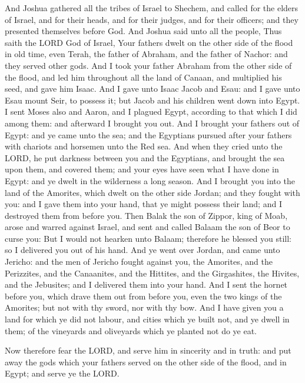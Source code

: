  And Joshua gathered all the tribes of Israel to Shechem,
and called for the elders of Israel, and for their heads, and for their
judges, and for their officers; and they presented themselves before
God.  And Joshua said unto all the people, Thus saith the
LORD God of Israel, Your fathers dwelt on the other side of the flood in
old time, even Terah, the father of Abraham, and the father of Nachor:
and they served other gods.  And I took your father
Abraham from the other side of the flood, and led him throughout all the
land of Canaan, and multiplied his seed, and gave him Isaac.
 And I gave unto Isaac Jacob and Esau: and I gave unto
Esau mount Seir, to possess it; but Jacob and his children went down
into Egypt.  I sent Moses also and Aaron, and I plagued
Egypt, according to that which I did among them: and afterward I brought
you out.  And I brought your fathers out of Egypt: and ye
came unto the sea; and the Egyptians pursued after your fathers with
chariots and horsemen unto the Red sea.  And when they
cried unto the LORD, he put darkness between you and the Egyptians, and
brought the sea upon them, and covered them; and your eyes have seen
what I have done in Egypt: and ye dwelt in the wilderness a long season.
 And I brought you into the land of the Amorites, which
dwelt on the other side Jordan; and they fought with you: and I gave
them into your hand, that ye might possess their land; and I destroyed
them from before you.  Then Balak the son of Zippor, king
of Moab, arose and warred against Israel, and sent and called Balaam the
son of Beor to curse you:  But I would not hearken unto
Balaam; therefore he blessed you still: so I delivered you out of his
hand.  And ye went over Jordan, and came unto Jericho:
and the men of Jericho fought against you, the Amorites, and the
Perizzites, and the Canaanites, and the Hittites, and the Girgashites,
the Hivites, and the Jebusites; and I delivered them into your hand.
 And I sent the hornet before you, which drave them out
from before you, even the two kings of the Amorites; but not with thy
sword, nor with thy bow.  And I have given you a land for
which ye did not labour, and cities which ye built not, and ye dwell in
them; of the vineyards and oliveyards which ye planted not do ye eat.

 Now therefore fear the LORD, and serve him in sincerity
and in truth: and put away the gods which your fathers served on the
other side of the flood, and in Egypt; and serve ye the LORD.

